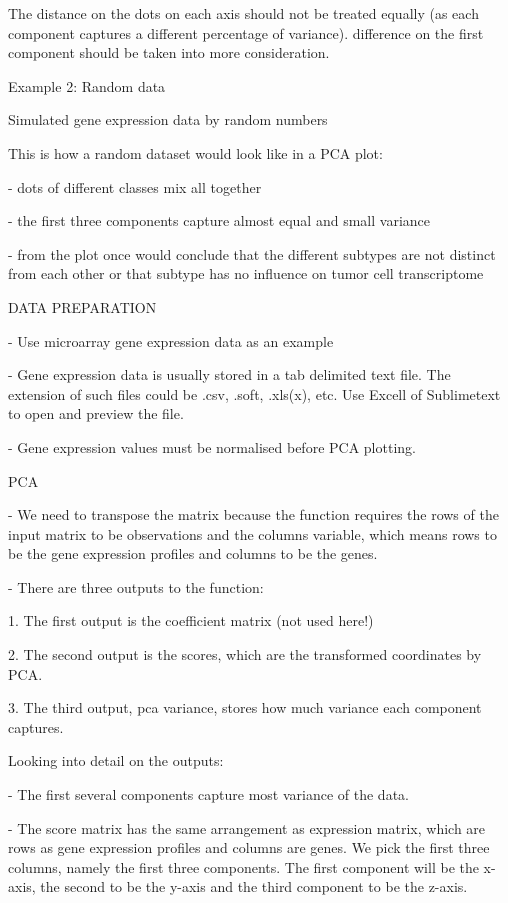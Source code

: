 \documentclass[11pt, oneside]{article}   	%
\begin{document}
The distance on the dots on each axis should not be treated equally (as each component captures a different percentage of variance). difference on the first component should be taken into more consideration.



Example 2: Random data

Simulated gene expression data by random numbers

This is how a random dataset would look like in a PCA plot:

- dots of different classes mix all together

- the first three components capture almost equal and small variance

- from the plot once would conclude that the different subtypes are not distinct from each other or that subtype has no influence on tumor cell transcriptome



DATA PREPARATION

- Use microarray gene expression data as an example

- Gene expression data is usually stored in a tab delimited text file. The extension of such files could be .csv, .soft, .xls(x), etc. Use Excell of Sublimetext to open and preview the file.

- Gene expression values must be normalised before PCA plotting.


PCA

- We need to transpose the matrix because the function requires the rows of the input matrix to be observations and the columns variable, which means rows to be the gene expression profiles and columns to be the genes.

- There are three outputs to the function:

1. The first output is the coefficient matrix (not used here!)

2. The second output is the scores, which are the transformed coordinates by PCA.

3. The third output, pca variance, stores how much variance each component captures.


Looking into detail on the outputs:

- The first several components capture most variance of the data.

- The score matrix has the same arrangement as expression matrix, which are rows as gene expression profiles and columns are genes. We pick the first three columns, namely the first three components. The first component will be the x-axis, the second to be the y-axis and the third component to be the z-axis.
\end{document}
